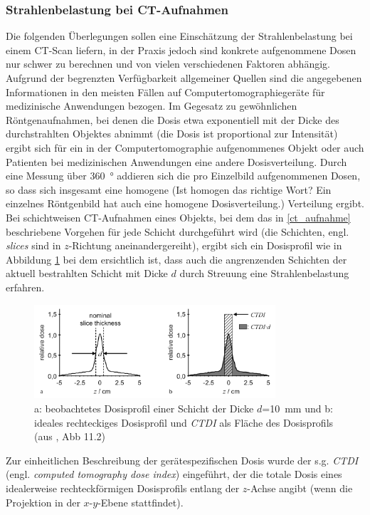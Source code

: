 \documentclass[11pt, a4paper]{article}
\numberwithin{equation}{section}
\newcommand{\korr}[1]{{\color{red}(#1)}}
\begin{document}
\subsubsection{Strahlenbelastung bei CT-Aufnahmen}
Die folgenden Überlegungen sollen eine Einschätzung der Strahlenbelastung bei einem CT-Scan liefern, in der Praxis jedoch sind konkrete aufgenommene Dosen nur schwer zu berechnen und von vielen verschiedenen Faktoren abhängig.
Aufgrund der begrenzten Verfügbarkeit allgemeiner Quellen sind die angegebenen Informationen in den meisten Fällen auf Computertomographiegeräte für medizinische Anwendungen bezogen.
Im Gegesatz zu gewöhnlichen Röntgenaufnahmen, bei denen die Dosis etwa exponentiell mit der Dicke des durchstrahlten Objektes abnimmt (die Dosis ist proportional zur Intensität) ergibt sich für ein in der Computertomographie aufgenommenes Objekt oder auch Patienten bei medizinischen Anwendungen eine andere Dosisverteilung.
Durch eine Messung über \SI{360}{\degree} addieren sich die pro Einzelbild aufgenommenen Dosen, so dass sich insgesamt eine homogene \korr{Ist homogen das richtige Wort? Ein einzelnes Röntgenbild hat auch eine homogene Dosisverteilung.} Verteilung ergibt.
Bei schichtweisen CT-Aufnahmen eines Objekts, bei dem das in \ref{ct_aufnahme} beschriebene Vorgehen für jede Schicht durchgeführt wird (die Schichten, engl. \emph{slices} sind in $z$-Richtung aneinandergereiht), ergibt sich ein Dosisprofil wie in Abbildung \ref{fig:ct_dosisprofil} bei dem ersichtlich ist, dass auch die angrenzenden Schichten der aktuell bestrahlten Schicht mit Dicke $d$ durch Streuung eine Strahlenbelastung erfahren.
\begin{figure}[ht]
	\centering
	\includegraphics[width=0.8\textwidth]{./figures/ct/dosisprofil.png}
	\caption{a: beobachtetes Dosisprofil einer Schicht der Dicke $d$=\SI{10}{mm} und b: ideales rechteckiges Dosisprofil und \emph{CTDI} als Fläche des Dosisprofils (aus \cite{buzug}, Abb 11.2)}
	\label{fig:ct_dosisprofil}
\end{figure}
Zur einheitlichen Beschreibung der gerätespezifischen Dosis wurde der s.g. \emph{CTDI} (engl. \emph{computed tomography dose index}) eingeführt, der die totale Dosis eines idealerweise rechteckförmigen Dosisprofils entlang der $z$-Achse angibt (wenn die Projektion in der $x$-$y$-Ebene stattfindet)\cite{buzug}.
\end{document}

